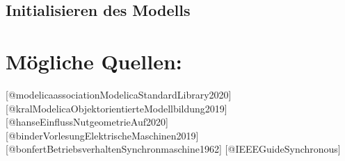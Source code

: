 \hypertarget{initialisieren-des-modells}{%
\subsection{Initialisieren des
Modells}\label{initialisieren-des-modells}}

\hypertarget{muxf6gliche-quellen}{%
\section{Mögliche Quellen:}\label{muxf6gliche-quellen}}

{[}@modelicaassociationModelicaStandardLibrary2020{]}
{[}@kralModelicaObjektorientierteModellbildung2019{]}
{[}@hanseEinflussNutgeometrieAuf2020{]}
{[}@binderVorlesungElektrischeMaschinen2019{]}
{[}@bonfertBetriebsverhaltenSynchronmaschine1962{]}
{[}@IEEEGuideSynchronous{]}

